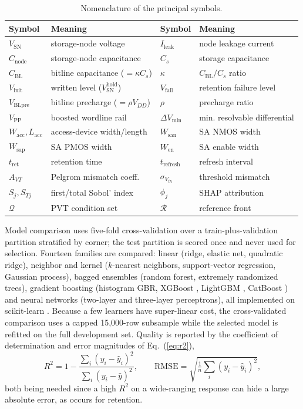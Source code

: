 \documentclass[11pt,a4paper]{article}
\newcommand{\Vsn}{V_{\mathrm{SN}}}
\newcommand{\Vfail}{V_{\mathrm{fail}}}
\newcommand{\Vblpre}{V_{\mathrm{BLpre}}}
\newcommand{\Ileak}{I_{\mathrm{leak}}}
\newcommand{\Cnode}{C_{\mathrm{node}}}
\newcommand{\Cs}{C_{s}}
\newcommand{\Cbl}{C_{\mathrm{BL}}}
\newcommand{\tret}{t_{\mathrm{ret}}}
\newcommand{\dVmin}{\Delta V_{\min}}
\begin{document}
\begin{table}[!ht]
\centering
\caption{Nomenclature of the principal symbols.}
\label{tab:nomen}
\footnotesize
\begin{tabular}{@{}ll@{\hskip 24pt}ll@{}}
\toprule
\textbf{Symbol} & \textbf{Meaning} & \textbf{Symbol} & \textbf{Meaning} \\
\midrule
$\Vsn$ & storage-node voltage & $\Ileak$ & node leakage current \\
$\Cnode$ & storage-node capacitance & $\Cs$ & storage capacitance \\
$\Cbl$ & bitline capacitance ($=\kappa\Cs$) & $\kappa$ & $\Cbl/\Cs$ ratio \\
$V_{\mathrm{init}}$ & written level ($\Vsn^{\mathrm{hold}}$) & $\Vfail$ & retention failure level \\
$\Vblpre$ & bitline precharge ($=\rho V_{DD}$) & $\rho$ & precharge ratio \\
$V_{\mathrm{PP}}$ & boosted wordline rail & $\dVmin$ & min. resolvable differential \\
$W_{\mathrm{acc}},L_{\mathrm{acc}}$ & access-device width/length & $W_{\mathrm{san}}$ & SA NMOS width \\
$W_{\mathrm{sap}}$ & SA PMOS width & $W_{\mathrm{en}}$ & SA enable width \\
$\tret$ & retention time & $t_{\mathrm{refresh}}$ & refresh interval \\
$A_{VT}$ & Pelgrom mismatch coeff. & $\sigma_{V_{th}}$ & threshold mismatch \\
$S_j,S_{Tj}$ & first/total Sobol' index & $\phi_j$ & SHAP attribution \\
$\mathcal{Q}$ & PVT condition set & $\mathcal{R}$ & reference front \\
\bottomrule
\end{tabular}
\end{table}

Model comparison uses five-fold cross-validation over a train-plus-validation
partition stratified by corner; the test partition is scored once and never used
for selection. Fourteen families are compared: linear (ridge, elastic net,
quadratic ridge), neighbor and kernel ($k$-nearest neighbors, support-vector
regression, Gaussian process), bagged ensembles (random forest, extremely
randomized trees), gradient boosting (histogram GBR, XGBoost
\cite{chen2016xgboost}, LightGBM \cite{ke2017lightgbm}, CatBoost
\cite{prokhorenkova2018catboost}) and neural networks (two-layer and three-layer
perceptrons), all implemented on scikit-learn \cite{pedregosa2011sklearn}. Because a
few learners have super-linear cost, the cross-validated comparison uses a capped
15,000-row subsample while the selected model is refitted on the full development
set. Quality is reported by the
coefficient of determination and error magnitudes of Eq.~(\ref{eq:r2}),
\begin{equation}
R^{2} = 1 - \frac{\sum_i (y_i-\hat y_i)^2}{\sum_i (y_i-\bar y)^2},
\qquad
\mathrm{RMSE} = \sqrt{\tfrac{1}{n}\textstyle\sum_i (y_i-\hat y_i)^2},
\label{eq:r2}
\end{equation}
both being needed since a high $R^{2}$ on a wide-ranging response can hide a large
absolute error, as occurs for retention.
\end{document}
